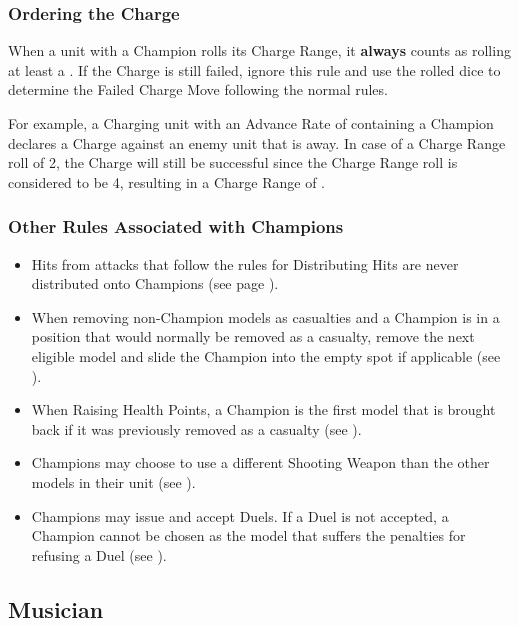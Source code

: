 \subsubsection{Ordering the Charge}
\label{ordering_the_charge}

When a unit with a Champion rolls its Charge Range, it \textbf{always} counts as rolling at least a . If the Charge is still failed, ignore this rule and use the rolled dice to determine the Failed Charge Move following the normal rules.

For example, a Charging unit with an Advance Rate of  containing a Champion declares a Charge against an enemy unit that is  away. In case of a Charge Range roll of 2, the Charge will still be successful since the Charge Range roll is considered to be 4, resulting in a Charge Range of .

\columnbreak

\subsubsection{Other Rules Associated with Champions}
\label{other_rules_associated_with_champions}

\begin{itemize}
	\item Hits from attacks that follow the rules for Distributing Hits are never distributed onto Champions (see page \pageref{distributing_hits}).
	\item When removing non-Champion \rnf{} models as casualties and a Champion is in a position that would normally be removed as a casualty, remove the next eligible \rnf{} model and slide the Champion into the empty spot if applicable (see ).
	\item When Raising Health Points, a Champion is the first model that is brought back if it was previously removed as a casualty (see ).
	\item Champions may choose to use a different Shooting Weapon than the other \rnf{} models in their unit (see ).
	\item Champions may issue and accept Duels. If a Duel is not accepted, a Champion cannot be chosen as the model that suffers the penalties for refusing a Duel (see ).
\end{itemize}

\subsection{Musician}
\label{musician}

